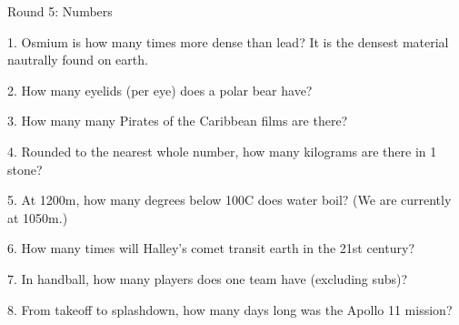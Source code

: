\begin{frame}
\begin{center}
\Huge
Round 5: Numbers
\end{center}
\end{frame}
\begin{frame}
\begin{center}
\Large
1. Osmium is how many times more dense than lead? It is the densest material nautrally found on earth.
\end{center}
\end{frame}
\begin{frame}
\begin{center}
\Large
2. How many eyelids (per eye) does a polar bear have?
\end{center}
\end{frame}
\begin{frame}
\begin{center}
\Large
3. How many many Pirates of the Caribbean films are there?
\end{center}
\end{frame}
\begin{frame}
\begin{center}
\Large
4. Rounded to the nearest whole number, how many kilograms are there in 1 stone?
\end{center}
\end{frame}
\begin{frame}
\begin{center}
\Large
5. At 1200m, how many degrees below 100\textdegree C does water boil? (We are currently at 1050m.)
\end{center}
\end{frame}
\begin{frame}
\begin{center}
\Large
6. How many times will Halley's comet transit earth in the 21st century?
\end{center}
\end{frame}
\begin{frame}
\begin{center}
\Large
7. In handball, how many players does one team have (excluding subs)?
\end{center}
\end{frame}
\begin{frame}
\begin{center}
\Large
8. From takeoff to splashdown, how many days long was the Apollo 11 mission?
\end{center}
\end{frame}
